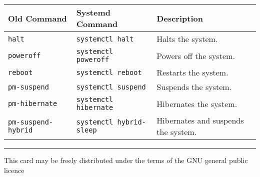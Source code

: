 \documentclass[a4paper]{article}
\begin{document}
\begin{center}
\vspace{6mm}

\begin{tabularx}{\textwidth}{ |X|X|X| }
\hline
\rowcolor[gray]{.8}
\bfseries Old Command & \bfseries Systemd Command  & \bfseries Description \\\hline
\tt halt              & \tt systemctl halt         & Halts the system. \\\hline
\tt poweroff          & \tt systemctl poweroff     & Powers off the system. \\\hline
\tt reboot            & \tt systemctl reboot       & Restarts the system. \\\hline
\tt pm-suspend        & \tt systemctl suspend      & Suspends the system. \\\hline
\tt pm-hibernate      & \tt systemctl hibernate    & Hibernates the system. \\\hline
\tt pm-suspend-hybrid & \tt systemctl hybrid-sleep & Hibernates and suspends the system. \\\hline
\end{tabularx}


\vfill \hrule\smallskip
{\tiny 
This card may be freely distributed under the terms of the GNU general public licence
}

\end{center}
\end{document}
